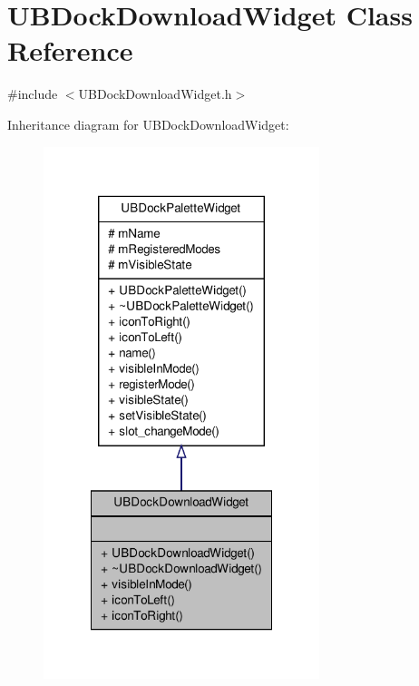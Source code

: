 \hypertarget{class_u_b_dock_download_widget}{\section{U\-B\-Dock\-Download\-Widget Class Reference}
\label{d8/d83/class_u_b_dock_download_widget}
}


{\ttfamily \#include $<$U\-B\-Dock\-Download\-Widget.\-h$>$}



Inheritance diagram for U\-B\-Dock\-Download\-Widget\-:
\nopagebreak
\begin{figure}[H]
\begin{center}
\leavevmode
\includegraphics[width=228pt]{d5/d93/class_u_b_dock_download_widget__inherit__graph}
\end{center}
\end{figure}


